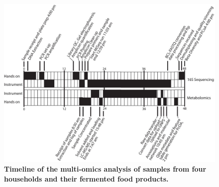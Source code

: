 \begin{figure}[htbp]
\includegraphics[width=\columnwidth]{chapter_48_hours_figures/F1.jpg}
\caption[Timeline of the multi-omics analysis of samples from four households and their fermented food products]{\textbf{Timeline of the multi-omics analysis of samples from four households and their fermented food products.}}
\label{rrfigure1}
\end{figure}

